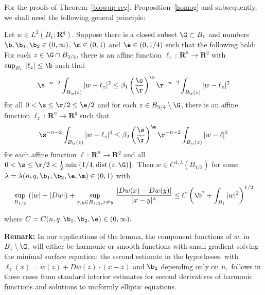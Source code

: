 \documentclass[a4paper,11pt]{amsart}
\begin{document}
For the proofs of Theorem~\ref{blowup-reg}, Proposition~\ref{homog} and subsequently, we shall need the following general principle:

\begin{lemma}\label{general}
Let $w \in L^{2}(B_{1}; {\mathbf R}^{q}).$ Suppose there is a closed subset $\G \subset B_{1}$ and numbers $ \b, \b_{1}, \b_{2} \in (0, \infty)$,  $\m  \in (0, 1)$ and $\e \in (0, 1/4)$ such that the following hold: For each $z \in \G \cap B_{3/4},$ there is an affine function $\ell_{z} \, : \, {\mathbf R}^{n} \to {\mathbf R}^{q}$ with $\sup_{B_{1}} \, |\ell_{z}| \leq \b$ such that  
$$\s^{-n-2}\int_{B_{\s}(z)} |w - \ell_{z}|^{2} \leq \beta_{1} \left(\frac{\s}{\r}\right)^{\m}\r^{-n-2}\int_{B_{\r}(z)}
|w - \ell_{z}|^{2}$$ 
\noindent
for all $0< \s \leq \r/2 \leq \e/2$ and  for each $z \in B_{3/4} \setminus \G$, there is an affine function $\ell_{z} \, : \, {\mathbf R}^{n} \to {\mathbf R}^{q}$ such that 
$$\s^{-n-2}\int_{B_{\s}(z)} |w - \ell_{z}|^{2} \leq \beta_{2} \left(\frac{\s}{\r}\right)^{\m}\r^{-n-2}\int_{B_{\r}(z)}
|w - \ell|^{2}$$ 
for each affine function $\ell \, : \, {\mathbf R}^{n} \to {\mathbf R}^{q}$ and all $0 < \s \leq \r/2 < \frac{1}{2}\min \, \{1/4, {\rm dist} \, (z, \G)\}.$ Then $w \in C^{1, \lambda}(B_{1/2})$ for some $\lambda = \lambda(n, q, \b_{1}, \b_{2}, \e, \m) \in (0, 1)$ with 
$$\sup_{B_{1/2}} \, \left(|w| + |Dw|\right) + \sup_{x, y \in B_{1/2}, x \neq y} \, \frac{|Dw(x) - Dw(y)|}{|x - y|^{\lambda}}
\leq C\left(\b^{2} + \int_{B_{1}}|w|^{2}\right)^{1/2}$$

\noindent
where $C = C(n, q, \b_{1}, \b_{2}, \e) \in (0, \infty).$
\end{lemma}

\noindent
{\bf Remark:} In our applications of the lemma, the component functions of $w$, in $B_{1} \setminus \G$, will either be harmonic or smooth functions with small gradient solving the minimal surface equation; the second estimate in the hypotheses, with $\ell_{z}(x) = w(z) + Dw(z) \cdot (x-z)$ and $\b_{2}$ depending only on $n,$ follows in these cases from standard interior estimates for second derivatives of harmonic functions and solutions to uniformly elliptic equations. 
\end{document}
